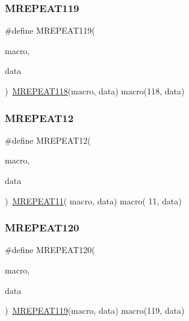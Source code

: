 \mbox{\label{group__group__sam0__utils__mrepeat_ga0aeae0af7aeb117fb68f133cd352ff17}} 
\subsubsection{\texorpdfstring{MREPEAT119}{MREPEAT119}}
{\footnotesize\ttfamily \#define M\+R\+E\+P\+E\+A\+T119(\begin{DoxyParamCaption}\item[{}]{macro,  }\item[{}]{data }\end{DoxyParamCaption})~\mbox{\hyperlink{group__group__sam0__utils__mrepeat_ga74dc399001884d2f1f942b502ce2b9b6}{M\+R\+E\+P\+E\+A\+T118}}(macro, data)   macro(118, data)}

\mbox{\label{group__group__sam0__utils__mrepeat_ga5e8405725939e1548f4c09088bb9284a}} 
\subsubsection{\texorpdfstring{MREPEAT12}{MREPEAT12}}
{\footnotesize\ttfamily \#define M\+R\+E\+P\+E\+A\+T12(\begin{DoxyParamCaption}\item[{}]{macro,  }\item[{}]{data }\end{DoxyParamCaption})~\mbox{\hyperlink{group__group__sam0__utils__mrepeat_gabd366a56c6734a5ce3ff89dc84760244}{M\+R\+E\+P\+E\+A\+T11}}( macro, data)   macro( 11, data)}

\mbox{\label{group__group__sam0__utils__mrepeat_ga4a67c3aed21abce662b2668e10a50d4b}} 
\subsubsection{\texorpdfstring{MREPEAT120}{MREPEAT120}}
{\footnotesize\ttfamily \#define M\+R\+E\+P\+E\+A\+T120(\begin{DoxyParamCaption}\item[{}]{macro,  }\item[{}]{data }\end{DoxyParamCaption})~\mbox{\hyperlink{group__group__sam0__utils__mrepeat_ga0aeae0af7aeb117fb68f133cd352ff17}{M\+R\+E\+P\+E\+A\+T119}}(macro, data)   macro(119, data)}

